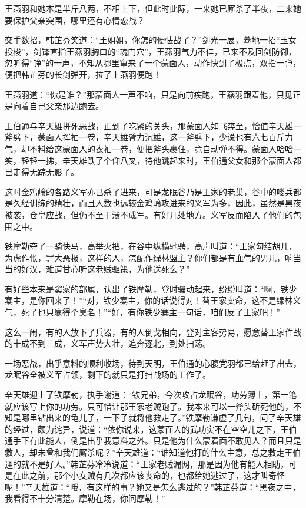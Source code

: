 \documentclass[12pt,oneside]{book}
\begin{document}
王燕羽和她本是半斤八两，不相上下，但此时此际，一来她已厮杀了半夜，二来她要保护父亲突围，哪里还有心情恋战？

交手数招，韩芷芬笑道：``王姐姐，你怎的便怯战了？''剑光一展，蓦地一招``玉女投梭''，剑锋直指王燕羽胸口的``魂门穴''，王燕羽气力不佳，已来不及回剑防御，忽听得``铮''的一声，不知从哪里窜来了一个蒙面人，动作快到了极点，双指一弹，便把韩芷芬的长剑弹开，拉了上燕羽便跑！

王燕羽道：``你是谁？''那蒙面人一声不响，只是向前疾跑，王燕羽跟着他，只见正是向着自己父亲那边跑去。

王伯通与辛天雄拼死恶战，正到了吃紧的关头，那蒙面人如飞奔至，恰值辛天雄一斧劈下，蒙面人挥袖一卷，辛天雄臂力沉雄，这一斧劈下，少说也有六七百斤力气，却不料给这蒙面人的衣袖一卷，便把斧头裹住，竟自动弹不得。蒙面人哈哈一笑，轻轻一拂，辛天雄跌了个仰八叉，待他跳起来时，王伯通父女和那个蒙面人都已走得无踪无影了。

这时金鸡岭的各路义军亦已杀了进来，可是龙眠谷乃是王家的老巢，谷中的喽兵都是久经训练的精壮，而且人数也远较金鸡岭攻进来的义军为多，因此，虽然是黑夜被袭，仓皇应战，但仍不至于溃不成军。有好几处地方。义军反而陷入了他们的包围之中。

铁摩勒夺了一骑快马，高举火把，在谷中纵横驰骋，高声叫道：``王家勾结胡儿，为虎作怅，罪大恶极，这样的人，怎配作绿林盟主？你们都是有血气的男儿，响当当的好汉，难道甘心听这老贼驱策，为他送死么？''

有好些本来是窦家的部属，认出了铁摩勒，登时骚动起来，纷纷叫道：``啊，铁少寨主，是你回来了！''``对，铁少寨主，你的话说得对！替王家卖命，这不是绿林义气，死了也只赢得个臭名！''``好，有你铁少寨主一句话，咱们反了王家吧！''

这么一闹，有的人放下了兵器，有的人倒戈相向，登对主客势易，愿意替王家作战的十成不到三成，义军声势大壮，追奔逐北，到处扫荡。

一场恶战，出乎意料的顺利收场，待到天明，王伯通的心腹党羽都已给赶了出去，龙眠谷全被义军占领，剩下的就只是打扫战场的工作了。

辛天雄迎上了铁摩勒，执手谢道：``铁兄弟，今次攻占龙眠谷，功劳簿上，第一笔就应该写上你的功劳。只可惜让那王家老贼跑了。我本来可以一斧头斫死他的，不知是哪里钻出来的龟儿子，一下子就将他救走了。''铁摩勒谦虚了几句，问了辛天雄的经过，颇为诧异，说道：``依你说来，这蒙面人的武功实不在空空儿之下，王伯通手下有此能人，倒是出乎我意料之外。只是他为什么蒙着面不敢见人？而且只是救人，却未曾和我们厮杀呢？''辛天雄道：``谁知道他打的什么主意，总之救走王伯通的就不是好人。''韩芷芬冷冷说道：``王家老贼漏网，那是因为他有能人相助，可是在此之前，那个小女贼有几次都应该丧命的，也都给她逃过了，这才叫奇怪呢！''辛天雄道：``哦，有这样的事？她又是怎么逃过的？''韩芷芬道：``黑夜之中，我看得不十分清楚。摩勒在场，你问摩勒！''
\end{document}
